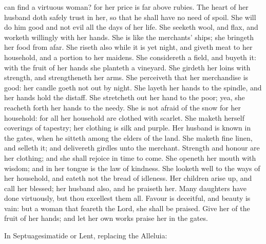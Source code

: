 \label{CommonNeitherVirginMartyrEpistle}
 can find a virtuous woman? for her price is far above rubies. The heart of her husband doth safely trust in her, so that he shall have no need of spoil. She will do him good and not evil all the days of her life. She seeketh wool, and flax, and worketh willingly with her hands. She is like the merchants' ships; she bringeth her food from afar. She riseth also while it is yet night, and giveth meat to her household, and a portion to her maidens. She considereth a field, and buyeth it: with the fruit of her hands she planteth a vineyard. She girdeth her loins with strength, and strengtheneth her arms. She perceiveth that her merchandise is good: her candle goeth not out by night. She layeth her hands to the spindle, and her hands hold the distaff. She stretcheth out her hand to the poor; yea, she reacheth forth her hands to the needy. She is not afraid of the snow for her household: for all her household are clothed with scarlet. She maketh herself coverings of tapestry; her clothing is silk and purple. Her husband is known in the gates, when he sitteth among the elders of the land. She maketh fine linen, and selleth it; and delivereth girdles unto the merchant. Strength and honour are her clothing; and she shall rejoice in time to come. She openeth her mouth with wisdom; and in her tongue is the law of kindness. She looketh well to the ways of her household, and eateth not the bread of idleness. Her children arise up, and call her blessed; her husband also, and he praiseth her. Many daughters have done virtuously, but thou excellest them all. Favour is deceitful, and beauty is vain: but a woman that feareth the Lord, she shall be praised. Give her of the fruit of her hands; and let her own works praise her in the gates.


\clearpage
\begin{rubric}
{In Septuagesimatide or Lent, replacing the Alleluia:}
\end{rubric}

\vspace{-1ex}


